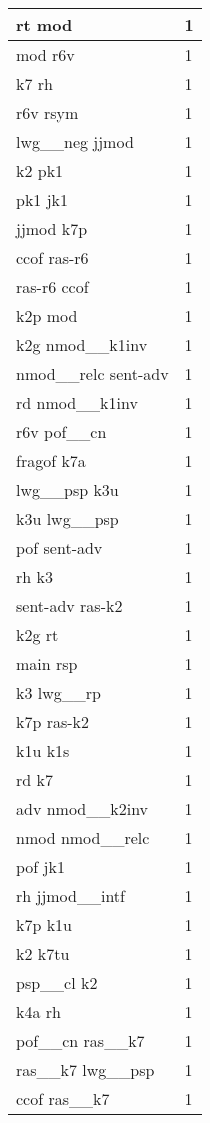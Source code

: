 \documentclass[a4 paper]{article}
\begin{document}
\begin{longtable}{p{}p{}}
rt mod  & 1 \\ \midrule
mod r6v  & 1 \\ \midrule
k7 rh  & 1 \\ \midrule
r6v rsym  & 1 \\ \midrule
lwg\_\_neg jjmod  & 1 \\ \midrule
k2 pk1  & 1 \\ \midrule
pk1 jk1  & 1 \\ \midrule
jjmod k7p  & 1 \\ \midrule
ccof ras-r6  & 1 \\ \midrule
ras-r6 ccof  & 1 \\ \midrule
k2p mod  & 1 \\ \midrule
k2g nmod\_\_k1inv  & 1 \\ \midrule
nmod\_\_relc sent-adv  & 1 \\ \midrule
rd nmod\_\_k1inv  & 1 \\ \midrule
r6v pof\_\_cn  & 1 \\ \midrule
fragof k7a  & 1 \\ \midrule
lwg\_\_psp k3u  & 1 \\ \midrule
k3u lwg\_\_psp  & 1 \\ \midrule
pof sent-adv  & 1 \\ \midrule
rh k3  & 1 \\ \midrule
sent-adv ras-k2  & 1 \\ \midrule
k2g rt  & 1 \\ \midrule
main rsp  & 1 \\ \midrule
k3 lwg\_\_rp  & 1 \\ \midrule
k7p ras-k2  & 1 \\ \midrule
k1u k1s  & 1 \\ \midrule
rd k7  & 1 \\ \midrule
adv nmod\_\_k2inv  & 1 \\ \midrule
nmod nmod\_\_relc  & 1 \\ \midrule
pof jk1  & 1 \\ \midrule
rh jjmod\_\_intf  & 1 \\ \midrule
k7p k1u  & 1 \\ \midrule
k2 k7tu  & 1 \\ \midrule
psp\_\_cl k2  & 1 \\ \midrule
k4a rh  & 1 \\ \midrule
pof\_\_cn ras\_\_k7  & 1 \\ \midrule
ras\_\_k7 lwg\_\_psp  & 1 \\ \midrule
ccof ras\_\_k7  & 1 \\ \midrule

\end{longtable}
\end{document}
